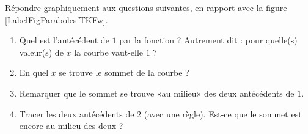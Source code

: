 
\begin{exercice}\label{exoPremiere-0032}

Répondre graphiquement aux questions suivantes, en rapport avec la figure \ref{LabelFigParabolesfTKFw}.
\newcommand{\CaptionFigParabolesfTKFw}{La parabole de l'exercice \ref{exoPremiere-0032}.}

\begin{enumerate}
    \item
        Quel est l'antécédent de \( 1\) par la fonction ? Autrement dit : pour quelle(s) valeur(s) de \( x\) la courbe vaut-elle \( 1\) ?
    \item
        En quel \( x\) se trouve le sommet de la courbe ?
    \item
        Remarquer que le sommet se trouve «au milieu» des deux antécédents de \( 1\).
    \item
        Tracer les deux antécédents de \( 2\) (avec une règle). Est-ce que le sommet est encore au milieu des deux ?
\end{enumerate}


\end{exercice}
